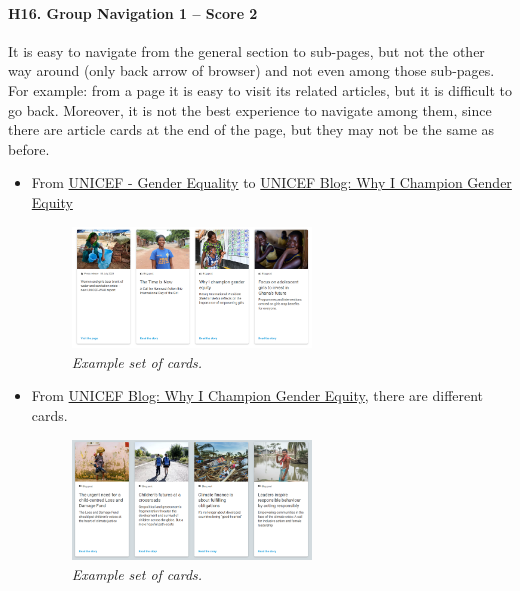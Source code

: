 \paragraph*{H16. Group Navigation 1 – Score 2}
It is easy to navigate from the general section to sub-pages, but not the other way around (only back arrow of browser) and not even among those sub-pages. For example: from a page it is easy to visit its related articles, but it is difficult to go back. Moreover, it is not the best experience to navigate among them, since there are article cards at the end of the page, but they may not be the same as before.
\begin{itemize}
	\item From \href{https://www.unicef.org/gender-equality}{UNICEF - Gender Equality} to \href{https://www.unicef.org/blog/why-i-champion-gender-equity}{UNICEF Blog: Why I Champion Gender Equity}
	\begin{figure}[h]
		\centering
		\begin{center}
			\includegraphics[width=0.6\textwidth]{Picture19.png}
		\end{center}
		\captionsetup{font=small}
		\caption{\textit{Example set of cards.}}
		\label{fig:label19}
	\end{figure}
	\item From \href{https://www.unicef.org/blog/why-i-champion-gender-equity}{UNICEF Blog: Why I Champion Gender Equity}, there are different cards.
	\begin{figure}[h]
		\centering
		\begin{center}
			\includegraphics[width=0.6\textwidth]{Picture20.png}
		\end{center}
		\captionsetup{font=small}
		\caption{\textit{Example set of cards.}}
		\label{fig:label20}
	\end{figure}
	
\end{itemize}

